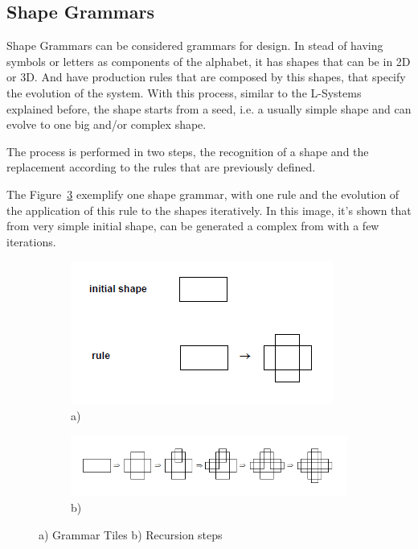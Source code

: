 
\subsection{Shape Grammars} %
\label{ssub:shape_grammars}


Shape Grammars can be considered grammars for design. In stead of having symbols or letters as components of the alphabet, it has shapes that can be in 2D or 3D. And have production rules that are composed by this shapes, that specify the evolution of the system. With this process, similar to the L-Systems explained before, the shape starts from a seed, i.e. a usually simple shape and can evolve to one big and/or complex shape.

The process is performed in two steps, the recognition of a shape and the replacement according to the rules that are previously defined. 

The Figure~\ref{fig:SGrammars} exemplify one shape grammar, with one rule and the evolution of the application of this rule to the shapes iteratively. In this image, it's shown that from very simple initial shape, can be generated a complex from with a few iterations.

\begin{figure}
        \centering
		\begin{subfigure}[b]{0.55\textwidth}
			\includegraphics[width=\textwidth]{img/Theory/Shape_Grammars/Grammar.png}
			\caption{a)}
			\label{fig:SGGrammar}
		\end{subfigure}
        
		\begin{subfigure}[b]{0.55\textwidth}
			\includegraphics[width=\textwidth]{img/Theory/Shape_Grammars/Recursion.png}
			\caption{b)}
			\label{fig:SGRecursion}
		\end{subfigure}
        \caption{a) Grammar Tiles b) Recursion steps}
        \label{fig:SGrammars}
\end{figure}

